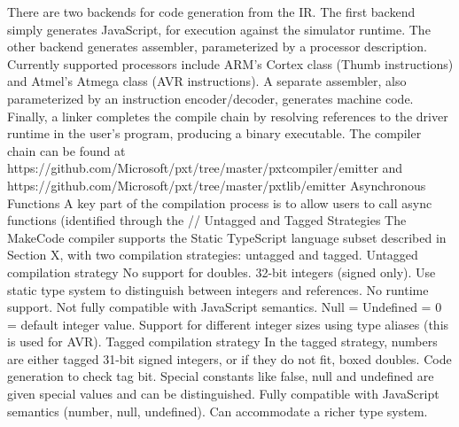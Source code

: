 {There are two backends for code generation from the IR. The first backend simply generates JavaScript, for execution against the simulator runtime.  The other backend generates assembler, parameterized by a processor description.  Currently supported processors include ARM’s Cortex class (Thumb instructions) and Atmel’s Atmega class (AVR instructions). A separate assembler, also parameterized by an instruction encoder/decoder, generates machine code. Finally, a linker completes the compile chain by resolving references to the driver runtime in the user’s program, producing a binary executable. The compiler chain can be found at https://github.com/Microsoft/pxt/tree/master/pxtcompiler/emitter and https://github.com/Microsoft/pxt/tree/master/pxtlib/emitter 
Asynchronous Functions
A key part of the compilation process is to allow users to call async functions (identified through the //%
Untagged and Tagged Strategies
The MakeCode compiler supports the Static TypeScript language subset described in Section X, with two compilation strategies: untagged and tagged. 
Untagged compilation strategy
No support for doubles. 32-bit integers (signed only). Use static type system to distinguish between integers and references.  No runtime support.  Not fully compatible with JavaScript semantics. Null = Undefined = 0 = default integer value.  Support for different integer sizes using type aliases (this is used for AVR). 
Tagged compilation strategy
In the tagged strategy, numbers are either tagged 31-bit signed integers, or if they do not fit, boxed doubles. Code generation to check tag bit. Special constants like false, null and undefined are given special values and can be distinguished. Fully compatible with JavaScript semantics (number, null, undefined).   Can accommodate a richer type system. 
}
